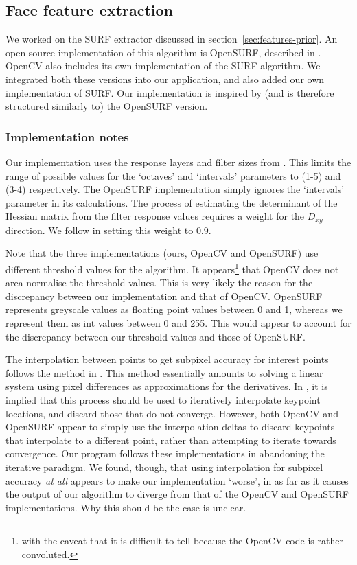 
\subsection{Face feature extraction}
\label{sec:features}

We worked on the SURF extractor discussed in section~\ref{sec:features-prior}. An open-source implementation of this algorithm is OpenSURF, described in \cite{OpenSURF}. OpenCV also includes its own implementation of the SURF algorithm. We integrated both these versions into our application, and also added our own implementation of SURF. Our implementation is inspired by (and is therefore structured similarly to) the OpenSURF version.

\subsubsection{Implementation notes}
Our implementation uses the response layers and filter sizes from \cite{SURF}. This limits the range of possible values for the `octaves' and `intervals' parameters to (1-5) and (3-4) respectively. The OpenSURF implementation simply ignores the `intervals' parameter in its calculations. The process of estimating the determinant of the Hessian matrix from the filter response values requires a weight for the $D_{xy}$ direction. We follow \cite{SURF} in setting this weight to $0.9$.

Note that the three implementations (ours, OpenCV and OpenSURF) use different threshold values for the algorithm. It appears\footnote{ with the caveat that it is difficult to tell because the OpenCV code is rather convoluted.} that OpenCV does not area-normalise the threshold values. This is very likely the reason for the discrepancy between our implementation and that of OpenCV. OpenSURF represents greyscale values as floating point values between 0 and 1, whereas we represent them as int values between 0 and 255. This would appear to account for the discrepancy between our threshold values and those of OpenSURF.

The interpolation between points to get subpixel accuracy for interest points follows the method in \cite{inv-features}. This method essentially amounts to solving a linear system using pixel differences as approximations for the derivatives. In \cite{SURF}, it is implied that this process should be used to iteratively interpolate keypoint locations, and discard those that do not converge. However, both OpenCV and OpenSURF appear to simply use the interpolation deltas to discard keypoints that interpolate to a different point, rather than attempting to iterate towards convergence. Our program follows these implementations in abandoning the iterative paradigm. We found, though, that using interpolation for subpixel accuracy \emph{at all} appears to make our implementation `worse', in as far as it causes the output of our algorithm to diverge from that of the OpenCV and OpenSURF implementations. Why this should be the case is unclear.

